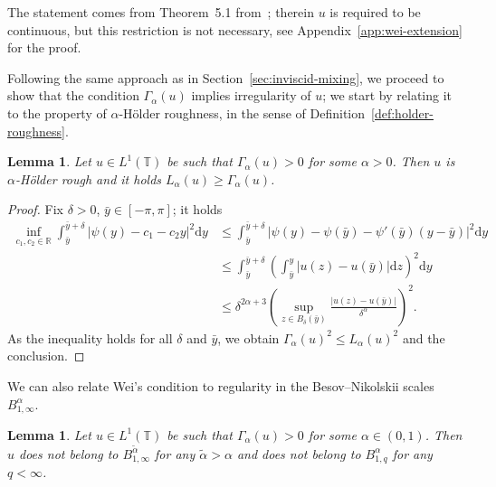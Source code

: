 \documentclass[11pt,oneside,reqno]{amsart}
\newcommand{\mathd}{\mathrm{d}}
\newtheorem{lemma}[theorem]{Lemma}
\numberwithin{equation}{section}
\begin{document}
The statement comes from Theorem~5.1 from~{\cite{wei}}; therein $u$ is
required to be continuous, but this restriction is not necessary, see
Appendix~\ref{app:wei-extension} for the proof.

Following the same approach as in Section~\ref{sec:inviscid-mixing}, we
proceed to show that the condition $\Gamma_{\alpha} (u)$ implies irregularity
of $u$; we start by relating it to the property of $\alpha$-H\"{o}lder
roughness, in the sense of Definition~\ref{def:holder-roughness}.

\begin{lemma}
  Let $u \in L^1 (\mathbb{T})$ be such that $\Gamma_{\alpha} (u) > 0$ for some
  $\alpha > 0$. Then $u$ is $\alpha$\mbox{-}H\"{o}lder rough and it holds
  $L_{\alpha} (u) \geqslant \Gamma_{\alpha} (u)$.
\end{lemma}

\begin{proof}
  Fix $\delta > 0$, $\bar{y} \in [- \pi, \pi]$; it holds
%  
  \begin{align*}
    \inf_{c_1, c_2 \in \mathbb{R}} \int_{\bar{y}}^{\bar{y} + \delta} | \psi
    (y) - c_1 - c_2 y |^2 \mathd y & \leqslant \int_{\bar{y}}^{\bar{y} +
    \delta} | \psi (y) - \psi (\bar{y}) - \psi' (\bar{y}) (y - \bar{y}) |^2
    \mathd y\\
    & \leqslant \int_{\bar{y}}^{\bar{y} + \delta} \left( \int_{\bar{y}}^y | u
    (z) - u (\bar{y}) | \mathd z \right)^2 \mathd y\\
    & \leqslant \delta^{2 \alpha + 3}  \left( \sup_{z \in B_{\delta}
    (\bar{y})} \frac{| u (z) - u (\bar{y}) |}{\delta^{\alpha}} \right)^2 .
  \end{align*}
% 
  As the inequality holds for all $\delta$ and $\bar{y}$, we obtain
  $\Gamma_{\alpha} (u)^2 \leqslant L_{\alpha} (u)^2$ and the conclusion.
\end{proof}

We can also relate Wei's condition to regularity in the Besov--Nikolskii
scales $B^{\alpha}_{1, \infty}$.

\begin{lemma}
  \label{lem:irr-wei}Let $u \in L^1 (\mathbb{T})$ be such that
  $\Gamma_{\alpha} (u) > 0$ for some $\alpha \in (0, 1)$. Then $u$ does not
  belong to $B^{\tilde{\alpha}}_{1, \infty}$ for any $\tilde{\alpha} > \alpha$
  and does not belong to $B^{\alpha}_{1, q}$ for any $q < \infty$.
\end{lemma}
\end{document}
